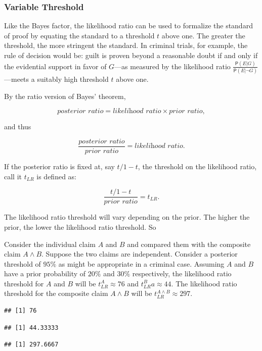 \documentclass[10pt,dvipsnames,enabledeprecatedfontcommands]{scrartcl}
\newcommand{\pr}[1]{\mathsf{P}(#1)}
\begin{document}
\subsubsection{Variable Threshold}\label{variable-threshold-1}

Like the Bayes factor, the likelihood ratio can be used to formalize the
standard of proof by equating the standard to a threshold \(t\) above
one. The greater the threshold, the more stringent the standard. In
criminal trials, for example, the rule of decision would be: guilt is
proven beyond a reasonable doubt if and only if the evidential support
in favor of \(G\)---as measured by the likelihood ratio
\(\frac{\pr{E \vert G}}{\pr{E \vert \neg G}}\)---meets a suitably high
threshold \(t\) above one.

By the ratio version of Bayes' theorem,

\[\textit{posterior ratio} = \textit{likelihood ratio} \times \textit{prior ratio},\]

and thus

\[\frac{\textit{posterior ratio}}{\textit{prior ratio}} = \textit{likelihood ratio}.\]

If the posterior ratio is fixed at, say \(t/1-t\), the threshold on the
likelihood ratio, call it \(t_{LR}\) is defined as:

\[\frac{t/1-t}{\textit{prior ratio}} = t_{LR}.\]

\noindent
The likelihood ratio threshold will vary depending on the prior. The
higher the prior, the lower the likelihood ratio threshold. So

Consider the individual claim \(A\) and \(B\) and compared them with the
composite claim \(A \wedge B\). Suppose the two claims are independent.
Consider a posterior threshold of \(95\%\) as might be appropriate in a
criminal case. Assuming \(A\) and \(B\) have a prior probability of
\(20\%\) and \(30\%\) respectively, the likelihood ratio threshold for
\(A\) and \(B\) will be \(t_{LR}^{A}\approx 76\) and
\(t_{LR}^{B}a\approx 44\). The likelihood ratio threshold for the
composite claim \(A \wedge B\) will be
\(t^{A\wedge B}_{LR}\approx 297\).

\begin{verbatim}
## [1] 76
\end{verbatim}

\begin{verbatim}
## [1] 44.33333
\end{verbatim}

\begin{verbatim}
## [1] 297.6667
\end{verbatim}
\end{document}
